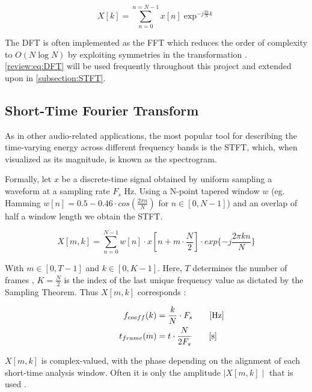 \begin{equation}
  X[k] =\sum_{n=0}^{n=N-1} x[n] \exp^{-j \frac{2 \pi}{N} k }
  \label{review:eq:DFT}
\end{equation}

The \ac{DFT} is often implemented as the \ac{FFT} which reduces the
order of complexity to $O(N\log{N})$ by exploiting symmetries in the
transformation \cite{OppenheimDSP}. \autoref{review:eq:DFT} will be used
frequently throughout this project and extended upon in
\autoref{subsection:STFT}.

\subsection{Short-Time Fourier Transform}
\label{subsection:STFT}

As in other audio-related applications, the most popular tool for describing the
time-varying energy across different frequency bands is the \ac{STFT}, which,
when visualized as its magnitude, is known as the spectrogram.

Formally, let $x$ be a discrete-time signal obtained by uniform sampling a
waveform at a sampling rate $F_{s}$ Hz. Using a N-point tapered window $w$ (eg.
Hamming $w[n] = 0.5-0.46\cdot cos(\frac{2\pi n}{N})$ for
$n\in\left[0,N-1\right]$) and an overlap of half a window length we obtain the
STFT.

\begin{equation}
  X [m,k] = \sum_{n=0}^{N-1}w[n]\cdot x[n + m\cdot\frac{N}{2}]\cdot exp\{-j\frac{2\pi k n }{N}\}
\end{equation}

With $m\in\left[0,T-1\right]$ and $k\in\left[0,K-1\right]$. Here, $T$ determines
the number of frames , $K = \frac{N}{2}$ is the index of the last unique
frequency value as dictated by the Sampling Theorem. Thus $X[m,k]$ corresponds :

\begin{equation}
  \begin{aligned}
    f_{coeff}(k) & = \frac{k}{N} \cdot F_{s} \mathrlap{\qquad [\si{\hertz}]}   \\
    t_{frame}(m) & = t \cdot \frac{N}{2F_{s}} \mathrlap{\qquad [\si{\second}]}
  \end{aligned}
  \label{review:eq:tradeoff}
\end{equation}

$X[m,k]$ is complex-valued, with the phase depending on the alignment of each
short-time analysis window. Often it is only the amplitude $\mid X[m,k] \mid$
that is used \cite{OppenheimDSP}.

